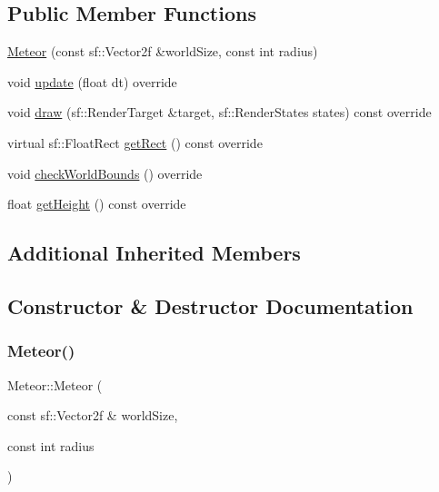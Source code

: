 \subsection*{Public Member Functions}
\begin{DoxyCompactItemize}
\item 
\hyperlink{class_meteor_a70f6f6e90203c47b3529d660c178bfbb}{Meteor} (const sf\+::\+Vector2f \&world\+Size, const int radius)
\item 
void \hyperlink{class_meteor_a141f6128d03a106bad61db3778404be7}{update} (float dt) override
\item 
void \hyperlink{class_meteor_a7fdbe8bd5027df6ae82e0d6391ec2b8d}{draw} (sf\+::\+Render\+Target \&target, sf\+::\+Render\+States states) const override
\item 
virtual sf\+::\+Float\+Rect \hyperlink{class_meteor_a7db7163153835475758d65e983086120}{get\+Rect} () const override
\item 
void \hyperlink{class_meteor_a8cedf36b39790de3b1e9882c36428e47}{check\+World\+Bounds} () override
\item 
float \hyperlink{class_meteor_a967d79131976578613c0387bd6569aa6}{get\+Height} () const override
\end{DoxyCompactItemize}
\subsection*{Additional Inherited Members}


\subsection{Constructor \& Destructor Documentation}
\mbox{\label{class_meteor_a70f6f6e90203c47b3529d660c178bfbb}} 
\subsubsection{\texorpdfstring{Meteor()}{Meteor()}}
{\footnotesize\ttfamily Meteor\+::\+Meteor (\begin{DoxyParamCaption}\item[{const sf\+::\+Vector2f \&}]{world\+Size,  }\item[{const int}]{radius }\end{DoxyParamCaption})}

